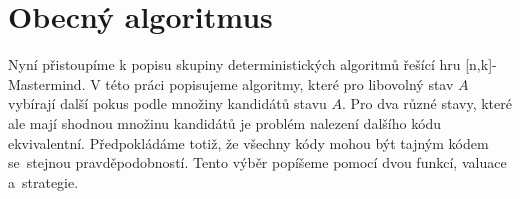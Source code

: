 \section{Obecný algoritmus}
Nyní přistoupíme k popisu skupiny deterministických algoritmů řešící hru [n,k]-Mastermind. V této práci popisujeme algoritmy, které pro libovolný stav $A$ vybírají další pokus podle množiny kandidátů stavu $A$. 
Pro dva různé stavy, které ale mají shodnou množinu kandidátů je problém nalezení dalšího kódu ekvivalentní. Předpokládáme totiž, že všechny kódy mohou být tajným kódem se~stejnou pravděpodobností. 
Tento výběr popíšeme pomocí dvou funkcí, valuace a~strategie. 















